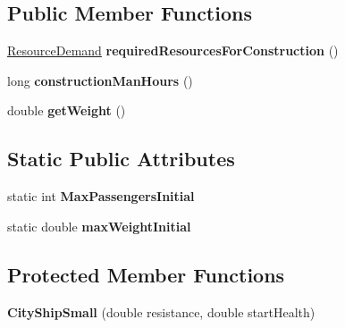 \subsection*{Public Member Functions}
\begin{DoxyCompactItemize}
\item 
\hyperlink{classuniverse_1_1_resource_demand}{Resource\+Demand} {\bfseries required\+Resources\+For\+Construction} ()\hypertarget{classtools_1_1vehicles_1_1space_1_1_city_ship_small_aa5b57a2219cb088fd397af29cc8391f1}{}\label{classtools_1_1vehicles_1_1space_1_1_city_ship_small_aa5b57a2219cb088fd397af29cc8391f1}

\item 
long {\bfseries construction\+Man\+Hours} ()\hypertarget{classtools_1_1vehicles_1_1space_1_1_city_ship_small_ae2eaf98ef2b82dedd267152c0ee8fc91}{}\label{classtools_1_1vehicles_1_1space_1_1_city_ship_small_ae2eaf98ef2b82dedd267152c0ee8fc91}

\item 
double {\bfseries get\+Weight} ()\hypertarget{classtools_1_1vehicles_1_1space_1_1_city_ship_small_a4e0ff300ef34e83d02ccaec09a97d170}{}\label{classtools_1_1vehicles_1_1space_1_1_city_ship_small_a4e0ff300ef34e83d02ccaec09a97d170}

\end{DoxyCompactItemize}
\subsection*{Static Public Attributes}
\begin{DoxyCompactItemize}
\item 
static int {\bfseries Max\+Passengers\+Initial}\hypertarget{classtools_1_1vehicles_1_1space_1_1_city_ship_small_a02692e53d8797f847fa0b4051a37e9cd}{}\label{classtools_1_1vehicles_1_1space_1_1_city_ship_small_a02692e53d8797f847fa0b4051a37e9cd}

\item 
static double {\bfseries max\+Weight\+Initial}\hypertarget{classtools_1_1vehicles_1_1space_1_1_city_ship_small_a6c003e4b22927799feac7018544491b0}{}\label{classtools_1_1vehicles_1_1space_1_1_city_ship_small_a6c003e4b22927799feac7018544491b0}

\end{DoxyCompactItemize}
\subsection*{Protected Member Functions}
\begin{DoxyCompactItemize}
\item 
{\bfseries City\+Ship\+Small} (double resistance, double start\+Health)\hypertarget{classtools_1_1vehicles_1_1space_1_1_city_ship_small_a89c509567157756e7d6ef5c218d1ad34}{}\label{classtools_1_1vehicles_1_1space_1_1_city_ship_small_a89c509567157756e7d6ef5c218d1ad34}

\end{DoxyCompactItemize}
